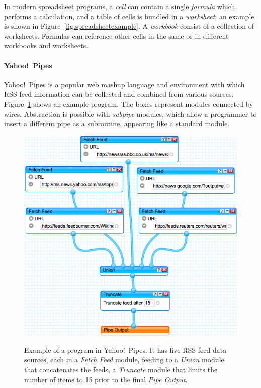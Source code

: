 \documentclass{sig-alternate}
\begin{document}
In modern spreadsheet programs, a \textit{cell} can contain a single \textit{formula} which performs a calculation, and a table of cells is bundled in a \textit{worksheet}; an example is shown in Figure~\ref{fig:spreadsheetexample}. 
A \textit{workbook} consist of a collection of worksheets.
Formulas can reference other cells in the same or in different workbooks and worksheets.


\paragraph{Yahoo!\ Pipes}
Yahoo!\ Pipes is a popular web mashup language and environment with which RSS feed information can be collected and combined from various sources.  Figure~\ref{fig:ypexample} shows an example program. The boxes represent modules connected by wires. 
Abstraction is possible with \emph{subpipe} modules, which allow a programmer to insert a different pipe as a subroutine, appearing like a standard module. 

\begin{figure}
\caption{Example of a program in Yahoo!\ Pipes. It has five RSS feed data sources, each in a \emph{Fetch Feed} module, feeding to a \emph{Union} module that concatenates the feeds, a \emph{Truncate} module that limits the number of items to 15 prior to the final \emph{Pipe Output}. }
\centering
\includegraphics[width=\columnwidth]{img/yp-1}
\label{fig:ypexample}
\end{figure}
\end{document}
